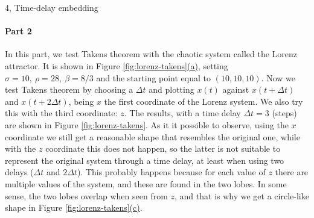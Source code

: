 \documentclass[10pt,a4paper]{article}
\begin{document}
\begin{task}{4, Time-delay embedding}
\paragraph{Part 2}
In this part, we test Takens theorem with the chaotic system called the Lorenz attractor. It is shown in Figure \hyperref[fig:lorenz-takens]{\ref{fig:lorenz-takens}(a)}, setting $\sigma = 10,\ \rho = 28,\ \beta = 8/3$ and the starting point equal to $(10,10,10)$.
Now we test Takens theorem by choosing a $\Delta t$ and plotting $x(t)$ against $x(t + \Delta t)$ and $x(t + 2 \Delta t)$, being $x$ the first coordinate of the Lorenz system.
We also try this with the third coordinate: $z$.
The results, with a time delay $\Delta t = 3$ (steps) are shown in Figure \ref{fig:lorenz-takens}.
As it it possible to observe, using the $x$ coordinate we still get a reasonable shape that resembles the original one, while with the $z$ coordinate this does not happen, so the latter is not suitable to represent the original system through a time delay, at least when using two delays ($\Delta t$ and $2 \Delta t$).
This probably happens because for each value of $z$ there are multiple values of the system, and these are found in the two lobes.
In some sense, the two lobes overlap when seen from $z$, and that is why we get a circle-like shape in Figure \hyperref[fig:lorenz-takens]{\ref{fig:lorenz-takens}(c)}.


\end{task}
\end{document}

